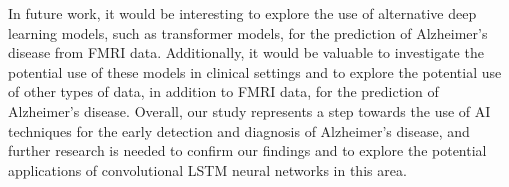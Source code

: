 \documentclass[10pt]{article}
\begin{document}
	In future work, it would be interesting to explore the use of alternative deep learning models, such as transformer models, for the prediction of Alzheimer's disease from FMRI data. Additionally, it would be valuable to investigate the potential use of these models in clinical settings and to explore the potential use of other types of data, in addition to FMRI data, for the prediction of Alzheimer's disease. Overall, our study represents a step towards the use of AI techniques for the early detection and diagnosis of Alzheimer's disease, and further research is needed to confirm our findings and to explore the potential applications of convolutional LSTM neural networks in this area.

    
	
	
\end{document}
